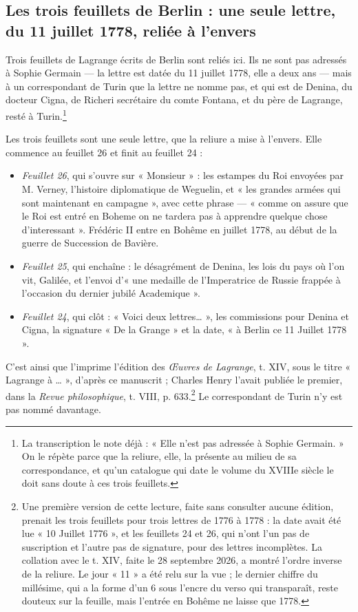 \documentclass[11pt,a4paper]{article}
\begin{document}
\subsection*{Les trois feuillets de Berlin : une seule lettre, du 11 juillet 1778, reliée à l'envers}

Trois feuillets de Lagrange écrits de Berlin sont reliés ici. Ils ne sont pas
adressés à Sophie Germain --- la lettre est datée du 11 juillet 1778, elle a
deux ans --- mais à un correspondant de Turin que la lettre ne nomme pas, et
qui est de Denina, du docteur Cigna, de Richeri secrétaire du comte Fontana,
et du père de Lagrange, resté à Turin.\footnote{La transcription le note
déjà : « Elle n'est pas adressée à Sophie Germain. » On le répète parce que la
reliure, elle, la présente au milieu de sa correspondance, et qu'un catalogue
qui date le volume du XVIIIe siècle le doit sans doute à ces trois feuillets.}

Les trois feuillets sont une seule lettre, que la reliure a mise à l'envers.
Elle commence au feuillet 26 et finit au feuillet 24 :

\begin{itemize}
  \item \emph{Feuillet 26}, qui s'ouvre sur « Monsieur » : les estampes du Roi
    envoyées par M. Verney, l'histoire diplomatique de Weguelin, et « les
    grandes armées qui sont maintenant en campagne », avec cette phrase ---
    « comme on assure que le Roi est entré en Boheme on ne tardera pas à
    apprendre quelque chose d'interessant ». Frédéric II entre en Bohême en
    juillet 1778, au début de la guerre de Succession de Bavière.
  \item \emph{Feuillet 25}, qui enchaîne : le désagrément de Denina, les lois
    du pays où l'on vit, Galilée, et l'envoi d'« une medaille de l'Imperatrice
    de Russie frappée à l'occasion du dernier jubilé Academique ».
  \item \emph{Feuillet 24}, qui clôt : « Voici deux lettres… », les
    commissions pour Denina et Cigna, la signature « De la Grange » et la date,
    « à Berlin ce 11 Juillet 1778 ».
\end{itemize}

C'est ainsi que l'imprime l'édition des \emph{Œuvres de Lagrange}, t. XIV,
sous le titre « Lagrange à … », d'après ce manuscrit ; Charles Henry l'avait
publiée le premier, dans la \emph{Revue philosophique}, t. VIII,
p. 633.\footnote{Une première version de cette lecture, faite sans consulter
aucune édition, prenait les trois feuillets pour trois lettres de 1776 à 1778 :
la date avait été lue « 10 Juillet 1776 », et les feuillets 24 et 26, qui
n'ont l'un pas de suscription et l'autre pas de signature, pour des lettres
incomplètes. La collation avec le t. XIV, faite le 28 septembre 2026, a montré
l'ordre inverse de la reliure. Le jour « 11 » a été relu sur la vue ; le
dernier chiffre du millésime, qui a la forme d'un 6 sous l'encre du verso qui
transparaît, reste douteux sur la feuille, mais l'entrée en Bohême ne laisse
que 1778.} Le correspondant de Turin n'y est pas nommé davantage.
\end{document}
